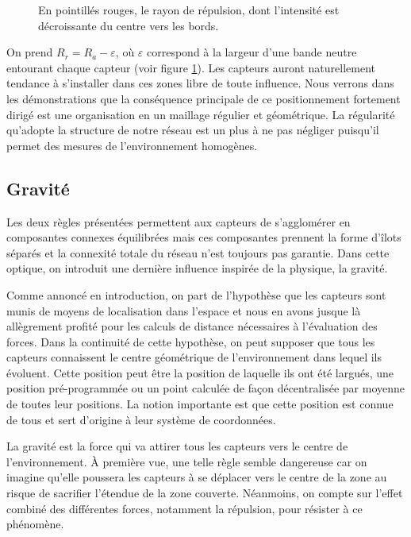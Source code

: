 \documentclass[10pt]{article}
\begin{document}
\begin{multicols}{2}
\begin{figure}[H]
  \centering

  

  \caption{En pointillés rouges, le rayon de répulsion, dont
    l'intensité est décroissante du centre vers les bords.}
  \label{repulsion}

\end{figure}

On prend $R_r = R_a - \varepsilon$, o\`u $\varepsilon$ correspond à la
largeur d'une bande neutre entourant chaque capteur (voir figure
\ref{repulsion}). Les capteurs auront naturellement tendance à
s'installer dans ces zones libre de toute influence. Nous verrons dans
les démonstrations que la conséquence principale de ce positionnement
fortement dirigé est une organisation en un maillage régulier et
géométrique. La régularité qu'adopte la structure de notre réseau est
un plus à ne pas négliger puisqu'il permet des mesures de
l'environnement homogènes.

\subsection*{Gravité}

Les deux règles présentées permettent aux capteurs de s'agglomérer en
composantes connexes équilibrées mais ces composantes prennent la
forme d'îlots séparés et la connexité totale du réseau n'est toujours
pas garantie. Dans cette optique, on introduit une dernière influence
inspirée de la physique, la gravité.

Comme annoncé en introduction, on part de l'hypothèse que les capteurs
sont munis de moyens de localisation dans l'espace et nous en avons
jusque là allègrement profité pour les calculs de distance nécessaires
à l'évaluation des forces. Dans la continuité de cette hypothèse, on
peut supposer que tous les capteurs connaissent le centre géométrique
de l'environnement dans lequel ils évoluent. Cette position peut être
la position de laquelle ils ont été largués, une position
pré-programmée ou un point calculée de façon décentralisée par moyenne
de toutes leur positions. La notion importante est que cette position
est connue de tous et sert d'origine à leur système de coordonnées.

La gravité est la force qui va attirer tous les capteurs vers le
centre de l'environnement. \`A première vue, une telle règle semble
dangereuse car on imagine qu'elle poussera les capteurs à se déplacer
vers le centre de la zone au risque de sacrifier l'étendue de la zone
couverte. Néanmoins, on compte sur l'effet combiné des différentes
forces, notamment la répulsion, pour résister à ce phénomène.


\end{multicols}
\end{document}
